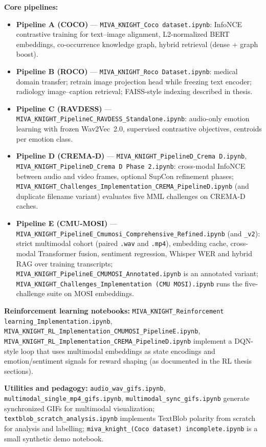 \documentclass[11pt,a4paper]{article}
\begin{document}
\textbf{Core pipelines:}
\begin{itemize}[leftmargin=1.5em]
  \item \textbf{Pipeline A (COCO)} --- \texttt{MIVA\_KNIGHT\_Coco dataset.ipynb}: InfoNCE contrastive training for text--image alignment, L2-normalized BERT embeddings, co-occurrence knowledge graph, hybrid retrieval (dense + graph boost).
  \item \textbf{Pipeline B (ROCO)} --- \texttt{MIVA\_KNIGHT\_Roco Dataset.ipynb}: medical domain transfer; retrain image projection head while freezing text encoder; radiology image--caption retrieval; FAISS-style indexing described in thesis.
  \item \textbf{Pipeline C (RAVDESS)} --- \texttt{MIVA\_KNIGHT\_PipelineC\_RAVDESS\_Standalone.ipynb}: audio-only emotion learning with frozen Wav2Vec~2.0, supervised contrastive objectives, centroids per emotion class.
  \item \textbf{Pipeline D (CREMA-D)} --- \texttt{MIVA\_KNIGHT\_PipelineD\_Crema D.ipynb}, \texttt{MIVA\_KNIGHT\_PipelineD\_Crema D Phase 2.ipynb}: cross-modal InfoNCE between audio and video frames, optional SupCon refinement phases; \texttt{MIVA\_KNIGHT\_Challenges\_Implementation\_CREMA\_PipelineD.ipynb} (and duplicate filename variant) evaluates five MML challenges on CREMA-D caches.
  \item \textbf{Pipeline E (CMU-MOSI)} --- \texttt{MIVA\_KNIGHT\_PipelineE\_Cmumosi\_Comprehensive\_Refined.ipynb} (and \texttt{\_v2}): strict multimodal cohort (paired \texttt{.wav} and \texttt{.mp4}), embedding cache, cross-modal Transformer fusion, sentiment regression, Whisper WER and hybrid RAG over training transcripts; \texttt{MIVA\_KNIGHT\_PipelineE\_CMUMOSI\_Annotated.ipynb} is an annotated variant; \texttt{MIVA\_KNIGHT\_Challenges\_Implementation (CMU MOSI).ipynb} runs the five-challenge suite on MOSI embeddings.
\end{itemize}

\textbf{Reinforcement learning notebooks:}
\texttt{MIVA\_KNIGHT\_Reinforcement learning\_Implementation.ipynb}, \texttt{MIVA\_KNIGHT\_RL\_Implementation\_CMUMOSI\_PipelineE.ipynb}, \texttt{MIVA\_KNIGHT\_RL\_Implementation\_CREMA\_PipelineD.ipynb} implement a DQN-style loop that uses multimodal embeddings as state encodings and emotion/sentiment signals for reward shaping (as documented in the RL thesis sections).

\textbf{Utilities and pedagogy:}
\texttt{audio\_wav\_gifs.ipynb}, \texttt{multimodal\_single\_mp4\_gifs.ipynb}, \texttt{multimodal\_sync\_gifs.ipynb} generate synchronized GIFs for multimodal visualization; \texttt{textblob\_scratch\_analysis.ipynb} implements TextBlob polarity from scratch for analysis and labelling; \verb|miva_knight_(Coco dataset) incomplete.ipynb| is a small synthetic demo notebook.
\end{document}
